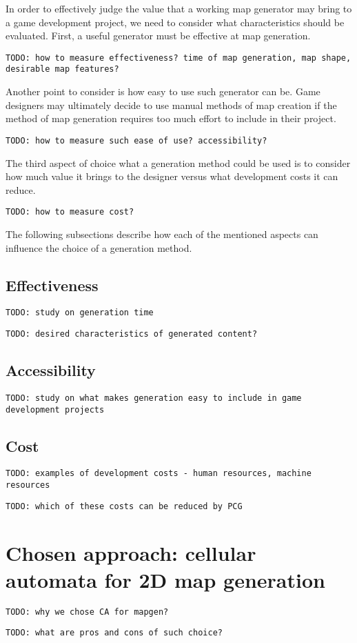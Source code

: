 \documentclass[12pt]{report}
\newcommand{\todo}[1]{}
\renewcommand{\todo}[1]{{\color{red} \par \noindent \footnotesize \texttt{TODO: {#1} }}}
\begin{document}
In order to effectively judge the value that a working map generator may bring to a game development project, we need to consider what characteristics should be evaluated. First, a useful generator must be effective at map generation.

\todo{how to measure effectiveness? time of map generation, map shape, desirable map features?}

Another point to consider is how easy to use such generator can be. Game designers may ultimately decide to use manual methods of map creation if the method of map generation requires too much effort to include in their project.

\todo{how to measure such ease of use? accessibility? }

The third aspect of choice what a generation method could be used is to consider how much value it brings to the designer versus what development costs it can reduce.

\todo{how to measure cost?}

The following subsections describe how each of the mentioned aspects can influence the choice of a generation method.

\subsection{Effectiveness} 
\todo{study on generation time}
\todo{desired characteristics of generated content?}

\subsection{Accessibility} 

\todo{study on what makes generation easy to include in game development projects}

\subsection{Cost} 
\todo{examples of development costs - human resources, machine resources}
\todo{which of these costs can be reduced by PCG}




\section{Chosen approach: cellular automata for 2D map generation}

\todo{why we chose CA for mapgen?}
\todo{what are pros and cons of such choice?}
\end{document}
